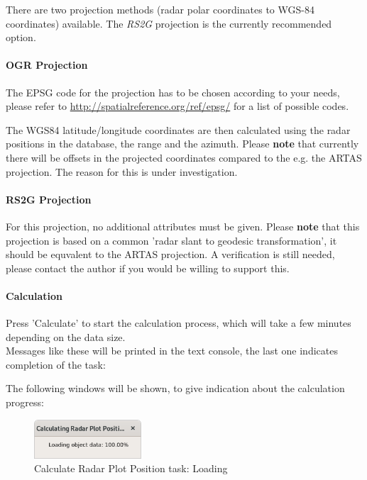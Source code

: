 There are two projection methods (radar polar coordinates to WGS-84 coordinates) available. The \textit{RS2G} projection is the currently recommended option.

\paragraph{OGR Projection}

The EPSG code for the projection has to be chosen according to your needs, please refer to \url{http://spatialreference.org/ref/epsg/} for a list of possible codes.

The WGS84 latitude/longitude coordinates are then calculated using the radar positions in the database, the range and the azimuth. Please \textbf{note} that currently there will be offsets in the projected coordinates compared to the e.g. the ARTAS projection. The reason for this is under investigation.

\paragraph{RS2G Projection}

For this projection, no additional attributes must be given. Please \textbf{note} that this projection is based on a common 'radar slant to geodesic transformation', it should be equvalent to the ARTAS projection. A verification is still needed, please contact the author if you would be willing to support this.

\paragraph{Calculation}

Press 'Calculate' to start the calculation process, which will take a few minutes depending on the data size. \\

Messages like these will be printed in the text console, the last one indicates completion of the task:

The following windows will be shown, to give indication about the calculation progress:

\begin{figure}[H]
  \center
    \includegraphics[width=4cm,frame]{../screenshots/task_calc_radar_load.png}
  \caption{Calculate Radar Plot Position task: Loading}
\end{figure}

